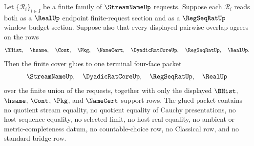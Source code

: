\begin{theorem}
\label{thm:streamname-finite-request-cover-gluing}
Let $\{\mathcal{R}_i\}_{i\in I}$ be a finite family of $\StreamNameUp$
requests. Suppose each $\mathcal{R}_i$ reads both as a $\RealUp$ endpoint
finite-request section and as a $\RegSeqRatUp$ window-budget section. Suppose
also that every displayed pairwise overlap agrees on the rows
$$
\BHist,\quad \hsame,\quad \Cont,\quad \Pkg,\quad \NameCert,\quad
\DyadicRatCoreUp,\quad \RegSeqRatUp,\quad \RealUp.
$$
Then the finite cover glues to one terminal four-face packet
$$
\StreamNameUp,\quad \DyadicRatCoreUp,\quad \RegSeqRatUp,\quad \RealUp
$$
over the finite union of the requests, together with only the displayed
$\BHist$, $\hsame$, $\Cont$, $\Pkg$, and $\NameCert$ support rows. The glued
packet contains no quotient stream equality, no quotient equality of Cauchy
presentations, no host sequence equality, no selected limit, no host real
equality, no ambient or metric-completeness datum, no countable-choice row, no
Classical row, and no standard bridge row.
\end{theorem}
